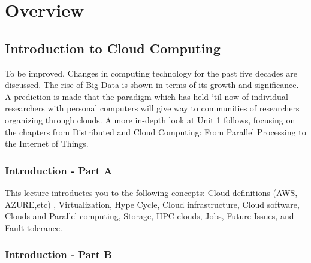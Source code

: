\chapter{Overview}
\label{s:overview}

\FILENAME

\section{Introduction to Cloud Computing}
\label{s:icloud-fundamentals}

To be improved. Changes in computing technology for the past five decades are discussed.
The rise of Big Data is shown in terms of its growth and significance. A
prediction is made that the paradigm which has held `til now of
individual researchers with personal computers will give way to
communities of researchers organizing through clouds. A more in-depth
look at Unit 1 follows, focusing on the chapters from Distributed and
Cloud Computing: From Parallel Processing to the Internet of Things.

%


\subsection{Introduction - Part A}\label{s:cloud-fundamentals-a}


This lecture introductes you to the following concepts: Cloud
definitions (AWS, AZURE,etc) , Virtualization, Hype Cycle, Cloud
infrastructure, Cloud software, Clouds and Parallel computing,
Storage, HPC clouds, Jobs, Future Issues, and Fault tolerance.

\subsection{Introduction - Part B}\label{s:cloud-fundamentals-b}


